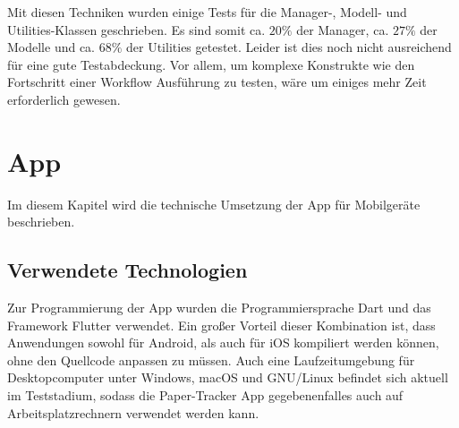 Mit diesen Techniken wurden einige Tests für die Manager-, Modell- und Utilities-Klassen geschrieben.
Es sind somit ca. $20\%$ der Manager, ca. $27\%$ der Modelle und ca. $68\%$ der Utilities getestet.
Leider ist dies noch nicht ausreichend für eine gute Testabdeckung.
Vor allem, um komplexe Konstrukte wie den Fortschritt einer Workflow Ausführung zu testen, wäre um einiges mehr Zeit erforderlich
gewesen.

\section{App}

Im diesem Kapitel wird die technische Umsetzung der App für Mobilgeräte beschrieben.

\subsection{Verwendete Technologien}

Zur Programmierung der App wurden die Programmiersprache Dart und das Framework Flutter verwendet.
Ein großer Vorteil dieser Kombination ist, dass Anwendungen sowohl für Android, als auch für iOS
kompiliert werden können, ohne den Quellcode anpassen zu müssen. Auch eine Laufzeitumgebung für
Desktopcomputer unter Windows, macOS und GNU/Linux befindet sich aktuell im Teststadium, sodass die
Paper-Tracker App gegebenenfalles auch auf Arbeitsplatzrechnern verwendet werden kann.

